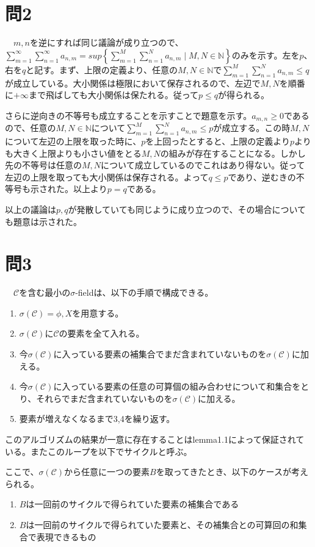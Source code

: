 \documentclass{article}
\begin{document}
\section{問2}
　$m, n$を逆にすれば同じ議論が成り立つので、$\sum_{m=1}^{\infty} \sum_{n = 1}^{\infty} a_{n,m} = sup\left\{ \sum_{m=1}^{M} \sum_{n = 1}^{N} a_{n,m} \mid M, N \in \mathbb{N}\right\}$のみを示す。左を$p$、右を$q$と記す。まず、上限の定義より、任意の$M, N \in \mathbb{N}$で$\sum_{m=1}^{M} \sum_{n = 1}^{N} a_{n,m} \leq q$が成立している。大小関係は極限において保存されるので、左辺で$M, N$を順番に$+\infty$まで飛ばしても大小関係は保たれる。従って$p \leq q$が得られる。

さらに逆向きの不等号も成立することを示すことで題意を示す。$a_{m,n} \geq 0$であるので、任意の$M, N \in \mathbb{N}$について$\sum_{m=1}^{M} \sum_{n = 1}^{N} a_{n,m} \leq p$が成立する。この時$M, N$について左辺の上限を取った時に、$p$を上回ったとすると、上限の定義より$p$よりも大きく上限よりも小さい値をとる$M, N$の組みが存在することになる。しかし先の不等号は任意の$M, N$について成立しているのでこれはあり得ない。従って左辺の上限を取っても大小関係は保存される。よって$q \leq p$であり、逆むきの不等号も示された。以上より$p = q$である。

以上の議論は$p, q$が発散していても同じように成り立つので、その場合についても題意は示された。

\section{問3}
　$\mathcal{C}$を含む最小の$\sigma$-fieldは、以下の手順で構成できる。
\begin{enumerate}
	\item $\sigma(\mathcal{C}) = \phi, X$を用意する。
	\item $\sigma(\mathcal{C})$に$\mathcal{C}$の要素を全て入れる。
	\item 今$\sigma(\mathcal{C})$に入っている要素の補集合でまだ含まれていないものを$\sigma(\mathcal{C})$に加える。
	\item 今$\sigma(\mathcal{C})$に入っている要素の任意の可算個の組み合わせについて和集合をとり、それらでまだ含まれていないものを$\sigma(\mathcal{C})$に加える。
	\item 要素が増えなくなるまで3,4を繰り返す。
\end{enumerate}
このアルゴリズムの結果が一意に存在することはlemma1.1によって保証されている。またこのループを以下でサイクルと呼ぶ。

ここで、$\sigma(\mathcal{C})$から任意に一つの要素$B$を取ってきたとき、以下のケースが考えられる。
\begin{enumerate}
	\item $B$は一回前のサイクルで得られていた要素の補集合である
	\item $B$は一回前のサイクルで得られていた要素と、その補集合との可算回の和集合で表現できるもの
\end{enumerate}
\end{document}
